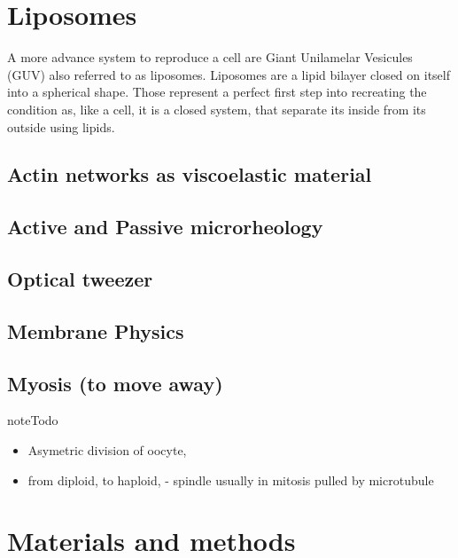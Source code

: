 \documentclass[A4paperpaper,11pt,english]{sphinxmanual}
\begin{document}
\chapter{Liposomes}
\label{parts/part1:liposomes}
A more advance system to reproduce a cell are Giant Unilamelar Vesicules
(GUV) also referred to as liposomes. Liposomes are a lipid bilayer closed on
itself into a spherical shape. Those represent a perfect first step into
recreating the condition as, like a cell, it is a closed system, that
separate its inside from its outside using lipids.


\section{Actin networks as viscoelastic material}
\label{parts/part1:actin-networks-as-viscoelastic-material}

\section{Active and Passive microrheology}
\label{parts/part1:active-and-passive-microrheology}

\section{Optical tweezer}
\label{parts/part1:optical-tweezer}

\section{Membrane Physics}
\label{parts/part1:membrane-physics}

\section{Myosis (to move away)}
\label{parts/part1:myosis-to-move-away}
\begin{notice}{note}{Todo}
\begin{itemize}
\item {} 
Asymetric division of oocyte,

\item {} 
from diploid, to haploid,
- spindle usually in mitosis pulled by microtubule

\end{itemize}
\end{notice}


\chapter{Materials and methods}
\label{parts/part2::doc}\label{parts/part2:materials-and-methods}
\end{document}
